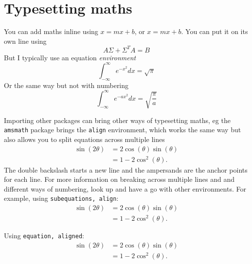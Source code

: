 \documentclass{article}
\begin{document}
\endgroup




\section{Typesetting maths}

You can add maths inline using $x=mx + b$, or \(x=mx+b\). You can put it on its own line using 
\[
    A\Sigma + \Sigma^T A = B
\]
But I typically use an equation \textit{environment}
\begin{equation}
    \int_{-\infty}^\infty e^{-x^2} d x = \sqrt{\pi}
\end{equation}
Or the same way but not with numbering
\begin{equation*}
    \int_{-\infty}^\infty e^{-ax^2} d x = \sqrt{\frac{\pi}{a}}
\end{equation*}

Importing other packages can bring other ways of typesetting maths, eg the \texttt{amsmath} package brings the \texttt{align} environment, which works the same way but also allows you to split equations across multiple lines
\begin{align}
    \sin(2\theta) & = 2\cos(\theta)\sin(\theta) \\
    & = 1-2\cos^2(\theta).
\end{align}
The double backslash starts a new line and the ampersands are the anchor points for each line.
For more information on breaking across multiple lines and and different ways of numbering, look up and have a go with other environments.
For example, using \texttt{subequations, align}:
\begin{subequations} %
\begin{align} %
    \sin(2\theta) & = 2\cos(\theta)\sin(\theta) \\
    & = 1-2\cos^2(\theta).
\end{align}
\end{subequations}

Using \texttt{equation, aligned}:
\begin{equation} %
\begin{aligned} %
    \sin(2\theta) & = 2\cos(\theta)\sin(\theta) \\
    & = 1-2\cos^2(\theta).
\end{aligned}
\end{equation}
\end{document}
